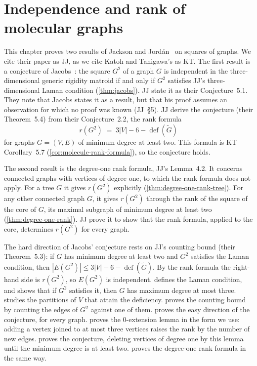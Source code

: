 \section{Independence and rank of molecular graphs}
\label{sec:jacobs}

This chapter proves two results of Jackson and
Jord\'an~\cite{jacksonJordan2008} on squares of graphs. We cite their
paper as JJ, as we cite Katoh and Tanigawa's as KT. The first result is
a conjecture of Jacobs~\cite{jacobs1998}: the square $G^2$ of a graph
$G$ is independent in the three-dimensional generic rigidity matroid if
and only if $G^2$ satisfies JJ's three-dimensional Laman condition
(\cref{thm:jacobs}). JJ state it as their Conjecture~5.1. They note that
Jacobs states it as a result, but that his proof assumes an observation
for which no proof was known (JJ~\S5). JJ derive the conjecture (their
Theorem~5.4) from their Conjecture~2.2, the rank formula
\[
  r(G^2) \;=\; 3|V| - 6 - \operatorname{def}(\tilde G)
\]
for graphs $G = (V, E)$ of minimum degree at least two. This formula is
KT Corollary~5.7 (\cref{cor:molecule-rank-formula}), so the conjecture
holds.

The second result is the degree-one rank formula, JJ's Lemma~4.2. It
concerns connected graphs with vertices of degree one, to which the rank
formula does not apply. For a tree $G$ it gives $r(G^2)$ explicitly
(\cref{thm:degree-one-rank-tree}). For any other connected graph $G$,
it gives $r(G^2)$ through the rank of the square of the core of $G$, its
maximal subgraph of minimum degree at least two
(\cref{thm:degree-one-rank}). JJ prove it to show that the rank
formula, applied to the core, determines $r(G^2)$ for every graph.

The hard direction of Jacobs' conjecture rests on JJ's counting bound
(their Theorem~5.3): if $G$ has minimum degree at least two and $G^2$
satisfies the Laman condition, then
$|E(G^2)| \le 3|V| - 6 - \operatorname{def}(\tilde G)$. By the rank
formula the right-hand side is $r(G^2)$, so $E(G^2)$ is independent.
 defines the Laman condition, and shows that if
$G^2$ satisfies it, then $G$ has maximum degree at most three.
 studies the partitions of $V$ that
attain the deficiency.  proves the counting
bound by counting the edges of $G^2$ against one of them.
 proves the easy direction of the conjecture, for
every graph.  proves the
$0$-extension lemma in the form we use: adding a vertex joined to at
most three vertices raises the rank by the number of new edges. 
proves the conjecture, deleting vertices of degree one by this lemma
until the minimum degree is at least two. 
proves the degree-one rank formula in the same way.

